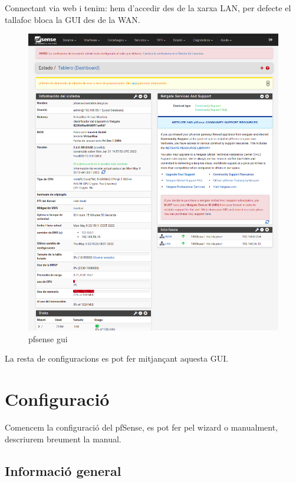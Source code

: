 \documentclass[
  10pt,
]{krantz}
\begin{document}
Connectant via web i tenim: hem d'accedir des de la xarxa LAN, per defecte el tallafoc bloca la GUI des de la WAN.

\begin{figure}
\centering
\includegraphics{imatges/pfSense_gui1.png}
\caption{pfsense gui}
\end{figure}

La resta de configuracions es pot fer mitjançant aquesta GUI.

\hypertarget{configuraciuxf3}{%
\section{Configuració}\label{configuraciuxf3}}

Comencem la configuració del pfSense, es pot fer pel wizard o manualment, descriurem breument la manual.

\hypertarget{informaciuxf3-general}{%
\subsection{Informació general}\label{informaciuxf3-general}}
\end{document}

